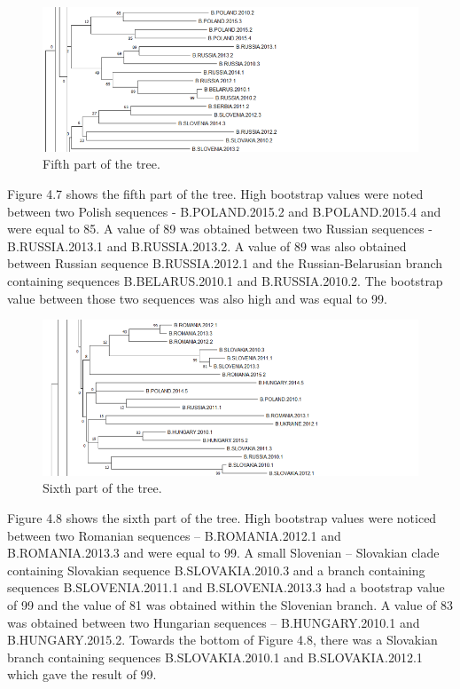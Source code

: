 \begin{figure}[h]
  \centering
  \includegraphics[width=0.7
\textwidth]{images/5.png}
  \caption{Fifth part of the tree.}
  \label{fig: Fifth part of the tree.}
\end{figure}

Figure 4.7 shows the fifth part of the tree.
High bootstrap values were noted between two Polish sequences - B.POLAND.2015.2 and B.POLAND.2015.4 and were equal to 85.
A value of 89 was obtained between two Russian sequences - B.RUSSIA.2013.1 and B.RUSSIA.2013.2.
A value of 89 was also obtained between Russian sequence B.RUSSIA.2012.1 and the Russian-Belarusian branch containing sequences B.BELARUS.2010.1 and B.RUSSIA.2010.2. 
The bootstrap value between those two sequences was also high and was equal to 99. 
\vspace{0.5in}
\begin{figure}[h]
  \centering
  \includegraphics[width=0.7
\textwidth]{images/6.png}
  \caption{Sixth part of the tree.}
  \label{fig: Sixth part of the tree.}
\end{figure}

Figure 4.8 shows the sixth part of the tree.
High bootstrap values were noticed between two Romanian sequences – B.ROMANIA.2012.1 and B.ROMANIA.2013.3 and were equal to 99.
A small Slovenian – Slovakian clade containing Slovakian sequence B.SLOVAKIA.2010.3 and a branch containing sequences B.SLOVENIA.2011.1 and B.SLOVENIA.2013.3 had a bootstrap value of 99 and the value of 81 was obtained within the Slovenian branch. 
A value of 83 was obtained between two Hungarian sequences – B.HUNGARY.2010.1 and B.HUNGARY.2015.2.
Towards the bottom of Figure 4.8, there was a Slovakian branch containing sequences B.SLOVAKIA.2010.1 and B.SLOVAKIA.2012.1 which gave the result of 99.


